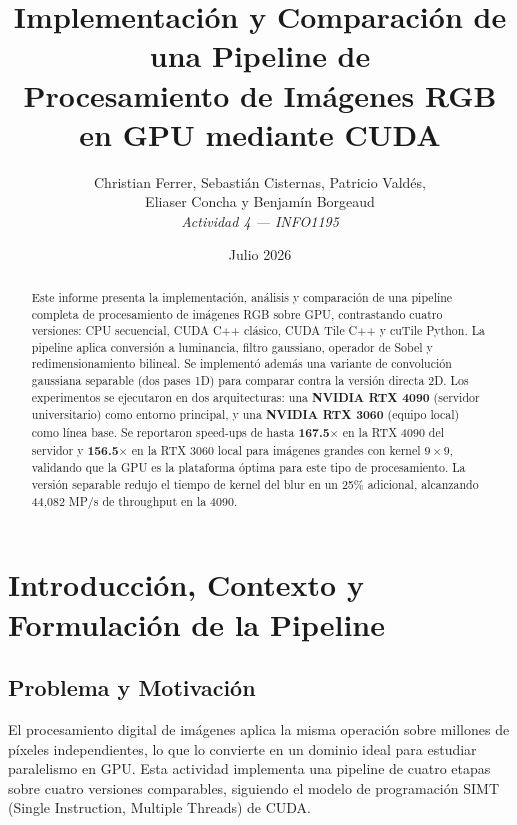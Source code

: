 \documentclass[12pt,a4paper]{article}
\title{\textbf{Implementaci\'on y Comparaci\'on de una Pipeline de\\ Procesamiento de Im\'agenes RGB en GPU mediante CUDA}}
\author{
  Christian Ferrer, Sebasti\'an Cisternas, Patricio Vald\'es, \\
  Eliaser Concha y Benjam\'in Borgeaud \\
  \vspace{0.3cm}
  \textit{Actividad 4 --- INFO1195}
}
\date{Julio 2026}
\begin{document}
\maketitle
\thispagestyle{empty}

\begin{abstract}
Este informe presenta la implementaci\'on, an\'alisis y comparaci\'on de una pipeline completa de procesamiento de im\'agenes RGB sobre GPU, contrastando cuatro versiones: CPU secuencial, CUDA C++ cl\'asico, CUDA Tile C++ y cuTile Python. La pipeline aplica conversi\'on a luminancia, filtro gaussiano, operador de Sobel y redimensionamiento bilineal. Se implement\'o adem\'as una variante de convoluci\'on gaussiana separable (dos pases 1D) para comparar contra la versi\'on directa 2D. Los experimentos se ejecutaron en dos arquitecturas: una \textbf{NVIDIA RTX 4090} (servidor universitario) como entorno principal, y una \textbf{NVIDIA RTX 3060} (equipo local) como l\'inea base. Se reportaron speed-ups de hasta \textbf{167.5$\times$} en la RTX 4090 del servidor y \textbf{156.5$\times$} en la RTX 3060 local para im\'agenes grandes con kernel $9 \times 9$, validando que la GPU es la plataforma \'optima para este tipo de procesamiento. La versi\'on separable redujo el tiempo de kernel del blur en un 25\% adicional, alcanzando 44,082 MP/s de throughput en la 4090.
\end{abstract}

\newpage
\tableofcontents
\newpage

\section{Introducci\'on, Contexto y Formulaci\'on de la Pipeline}

\subsection{Problema y Motivaci\'on}

El procesamiento digital de im\'agenes aplica la misma operaci\'on sobre millones de p\'ixeles independientes, lo que lo convierte en un dominio ideal para estudiar paralelismo en GPU. Esta actividad implementa una pipeline de cuatro etapas sobre cuatro versiones comparables, siguiendo el modelo de programaci\'on SIMT (Single Instruction, Multiple Threads) de CUDA.
\end{document}
